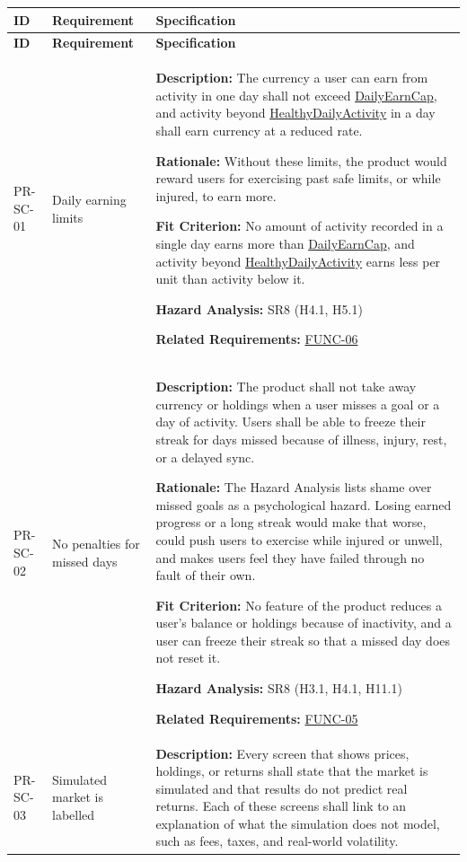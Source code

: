 \documentclass[12pt]{article}
\newcommand{\const}[1]{\hyperlink{const:#1}{\textsf{#1}}}
\begin{document}
\small
\setlength{\tabcolsep}{4pt}
\begin{xltabular}{\textwidth}{|p{2.6cm}|p{3.4cm}|X|}
\hline
\textbf{ID} & \textbf{Requirement} & \textbf{Specification} \\
\hline
\endfirsthead
\hline
\textbf{ID} & \textbf{Requirement} & \textbf{Specification} \\
\hline
\endhead

PR-SC-01\hypertarget{req:PR-SC-01}{} &
Daily earning limits &
\textbf{Description:} The currency a user can earn from activity in one day shall not exceed \const{DailyEarnCap}, and activity beyond \const{HealthyDailyActivity} in a day shall earn currency at a reduced rate.

\textbf{Rationale:} Without these limits, the product would reward users for exercising past safe limits, or while injured, to earn more.

\textbf{Fit Criterion:} No amount of activity recorded in a single day earns more than \const{DailyEarnCap}, and activity beyond \const{HealthyDailyActivity} earns less per unit than activity below it.

\textbf{Hazard Analysis:} SR8 (H4.1, H5.1)

\textbf{Related Requirements:} \hyperlink{req:FUNC-06}{FUNC-06}\\
\hline

PR-SC-02\hypertarget{req:PR-SC-02}{} &
No penalties for missed days &
\textbf{Description:} The product shall not take away currency or holdings when a user misses a goal or a day of activity. Users shall be able to freeze their streak for days missed because of illness, injury, rest, or a delayed sync.

\textbf{Rationale:} The Hazard Analysis lists shame over missed goals as a psychological hazard. Losing earned progress or a long streak would make that worse, could push users to exercise while injured or unwell, and makes users feel they have failed through no fault of their own.

\textbf{Fit Criterion:} No feature of the product reduces a user's balance or holdings because of inactivity, and a user can freeze their streak so that a missed day does not reset it.

\textbf{Hazard Analysis:} SR8 (H3.1, H4.1, H11.1)

\textbf{Related Requirements:} \hyperlink{req:FUNC-05}{FUNC-05}\\
\hline

PR-SC-03\hypertarget{req:PR-SC-03}{} &
Simulated market is labelled &
\textbf{Description:} Every screen that shows prices, holdings, or returns shall state that the market is simulated and that results do not predict real returns. Each of these screens shall link to an explanation of what the simulation does not model, such as fees, taxes, and real-world volatility.


\end{xltabular}
\end{document}
